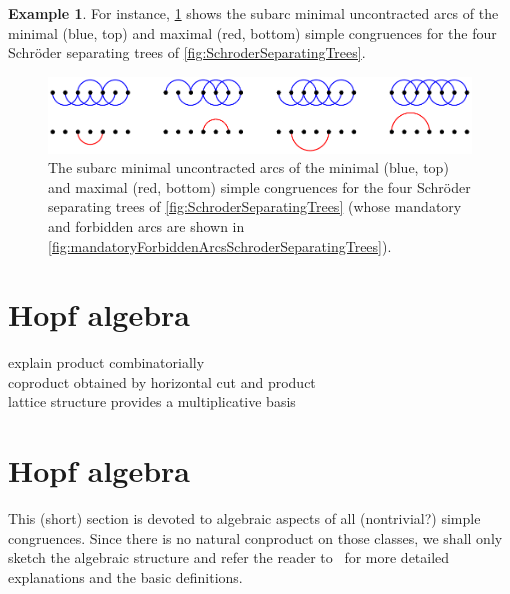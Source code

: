 \documentclass{amsart}
\theoremstyle{definition}
\newtheorem{example}[theorem]{Example}
\begin{document}
\begin{example}
For instance, \cref{fig:minMaxCongruencesSchroderSeparatingTrees} shows the subarc minimal uncontracted arcs of the minimal (blue, top) and maximal (red, bottom) simple congruences for the four Schröder separating trees of \cref{fig:SchroderSeparatingTrees}.
\begin{figure}
	\capstart
	\centerline{\includegraphics[scale=.85]{minMaxCongruencesSchroderSeparatingTrees}}
	\caption{The subarc minimal uncontracted arcs of the minimal (blue, top) and maximal (red, bottom) simple congruences for the four Schröder separating trees of \cref{fig:SchroderSeparatingTrees} (whose mandatory and forbidden arcs are shown in \cref{fig:mandatoryForbiddenArcsSchroderSeparatingTrees}).}
	\label{fig:minMaxCongruencesSchroderSeparatingTrees}
\end{figure}
\end{example}


\section{Hopf algebra}
\label{sec:HopfAlgebra}

explain product combinatorially \\
coproduct obtained by horizontal cut and product \\
lattice structure provides a multiplicative basis


\section{Hopf algebra}
\label{sec:HopfAlgebra}

This (short) section is devoted to algebraic aspects of all (nontrivial?)
simple congruences. Since there is no natural conproduct on those classes, we
shall only sketch the algebraic structure and refer the reader
to~\cite{ChatelPilaud, PilaudPons-permutrees} for more detailed explanations
and the basic definitions.
\end{document}
